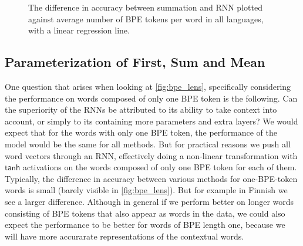 \documentclass[11pt]{article}
\begin{document}
\begin{figure}
        \caption{The difference in accuracy between summation and RNN plotted against average number of BPE
     tokens per word in all languages, with a linear regression line.}
    \label{fig:scatter_len}
    \end{figure}

    \subsection{Parameterization of First, Sum and Mean}

        One question that arises when looking at \cref{fig:bpe_lens},
     specifically considering the performance on words composed of
     only one BPE token is the following. Can the superiority of the RNNs be attributed to
     its ability to take context into account, or simply to its containing more
     parameters and extra layers?
         We would expect that for the words with only one BPE token,
     the performance of the model would be the same for all
     methods. But for practical reasons we push all word vectors
     through an RNN, effectively doing a non-linear transformation
     with $\mathsf{tanh}$ activations on the words composed of only
     one BPE token for each of them.
                Typically, the difference in accuracy between various
     methods for one-BPE-token words is small (barely visible in
     \cref{fig:bpe_lens}). But for example in Finnish we see a larger
     difference. Although in general if we perform better on longer
     words consisting of BPE tokens that also appear as words in the
     data, we could also expect the performance to be better for
     words of BPE length one, because we will have more accurarate
     representations of the contextual words.
\end{document}
